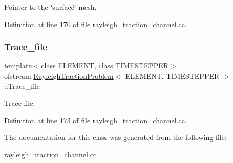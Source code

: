 Pointer to the \char`\"{}surface\char`\"{} mesh. 



Definition at line 170 of file rayleigh\+\_\+traction\+\_\+channel.\+cc.

\mbox{\label{classRayleighTractionProblem_aac28de2e912d5a48638d3399914ac153}} 
\subsubsection{\texorpdfstring{Trace\+\_\+file}{Trace\_file}}
{\footnotesize\ttfamily template$<$class E\+L\+E\+M\+E\+NT, class T\+I\+M\+E\+S\+T\+E\+P\+P\+ER$>$ \\
ofstream \hyperlink{classRayleighTractionProblem}{Rayleigh\+Traction\+Problem}$<$ E\+L\+E\+M\+E\+NT, T\+I\+M\+E\+S\+T\+E\+P\+P\+ER $>$\+::Trace\+\_\+file\hspace{0.3cm}{\ttfamily [private]}}



Trace file. 



Definition at line 173 of file rayleigh\+\_\+traction\+\_\+channel.\+cc.



The documentation for this class was generated from the following file\+:\begin{DoxyCompactItemize}
\item 
\hyperlink{rayleigh__traction__channel_8cc}{rayleigh\+\_\+traction\+\_\+channel.\+cc}\end{DoxyCompactItemize}
